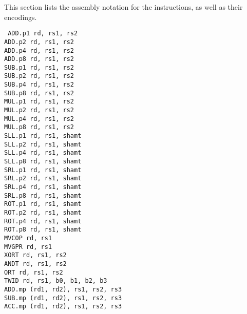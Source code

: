 This section lists the assembly notation for the instructions, as well as
their encodings.

{\tt
ADD.p1  rd, rs1, rs2            \\
ADD.p2  rd, rs1, rs2            \\
ADD.p4  rd, rs1, rs2            \\
ADD.p8  rd, rs1, rs2            \\
SUB.p1  rd, rs1, rs2            \\
SUB.p2  rd, rs1, rs2            \\
SUB.p4  rd, rs1, rs2            \\
SUB.p8  rd, rs1, rs2            \\
MUL.p1  rd, rs1, rs2            \\
MUL.p2  rd, rs1, rs2            \\
MUL.p4  rd, rs1, rs2            \\
MUL.p8  rd, rs1, rs2            \\
SLL.p1  rd, rs1, shamt          \\
SLL.p2  rd, rs1, shamt          \\
SLL.p4  rd, rs1, shamt          \\
SLL.p8  rd, rs1, shamt          \\
SRL.p1  rd, rs1, shamt          \\
SRL.p2  rd, rs1, shamt          \\
SRL.p4  rd, rs1, shamt          \\
SRL.p8  rd, rs1, shamt          \\
ROT.p1  rd, rs1, shamt          \\
ROT.p2  rd, rs1, shamt          \\
ROT.p4  rd, rs1, shamt          \\
ROT.p8  rd, rs1, shamt          \\
MVCOP   rd, rs1                 \\
MVGPR   rd, rs1                 \\
XORT    rd, rs1, rs2            \\
ANDT    rd, rs1, rs2            \\
ORT     rd, rs1, rs2            \\
TWID    rd, rs1, b0, b1, b2, b3 \\
ADD.mp  (rd1, rd2),  rs1, rs2, rs3 \\
SUB.mp  (rd1, rd2),  rs1, rs2, rs3 \\
ACC.mp  (rd1, rd2),  rs1, rs2, rs3 \\
}
